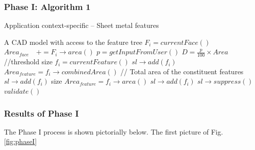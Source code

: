 \subsubsection{Phase I: Algorithm 1}


\begin{algorithm}[!h]
	\caption{Application context-specific – Sheet metal features}
	\label{alg1}
	\begin{algorithmic}
		\REQUIRE A CAD model with access to the feature tree
			\STATE $F_i = currentFace()$
			\STATE $Area_{face} \quad += F_i \rightarrow area()$
		\ENDWHILE		
		\STATE $p = getInputFromUser()$
		\STATE $D = \frac{p}{100} \times Area$  \hspace{60mm} //threshold size
			\STATE $f_i = currentFeature()$
				\STATE $sl \rightarrow add(f_i)$
			  	\STATE $Area_{feature} = f_i \rightarrow combinedArea()$ \hspace{20mm}  // Total area of the constituent features
			  		\STATE $sl \rightarrow add(f_i)$
				\ENDIF
			\ELSE
				\STATE size $Area_{feature} = f_i \rightarrow area()$
			  		\STATE $sl \rightarrow add(f_i)$
				\ENDIF				
			\ENDIF
		\ENDWHILE
		\STATE  $sl \rightarrow suppress()$
		\STATE  $validate()$
	\end{algorithmic}
\end{algorithm}

\subsubsection{Results of Phase I}

The Phase I process is shown pictorially below. The first picture of Fig. \ref{fig:phaseI}

